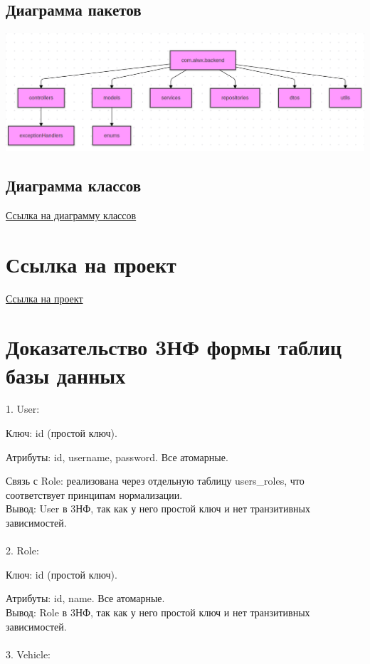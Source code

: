 \documentclass{article}
\begin{document}
    \subsection{Диаграмма пакетов}
        \begin{center}
            \includegraphics[width=.9\textwidth]{package_uml.png}
        \end{center}

\subsection{Диаграмма классов}
\href{https://www.mermaidchart.com/raw/7b97b9f2-bd1a-4381-be9d-0ba2c8f43344?theme=light&version=v0.1&format=svg}{Ссылка на диаграмму классов}

\section{Ссылка на проект}
\href{https://github.com/DenichenkoAlex/inf_sys_first_lab}{Ссылка на проект}

\section{Доказательство 3НФ формы таблиц базы данных}
1. User:

Ключ: id (простой ключ).

Атрибуты: id, username, password. Все атомарные.

Связь с Role: реализована через отдельную таблицу users\_roles, что соответствует принципам нормализации.
\\
Вывод: User в 3НФ, так как у него простой ключ и нет транзитивных зависимостей.
\\ \\
2. Role:

Ключ: id (простой ключ).

Атрибуты: id, name. Все атомарные.
\\
Вывод: Role в 3НФ, так как у него простой ключ и нет транзитивных зависимостей.
\\ \\
3. Vehicle:
\end{document}
